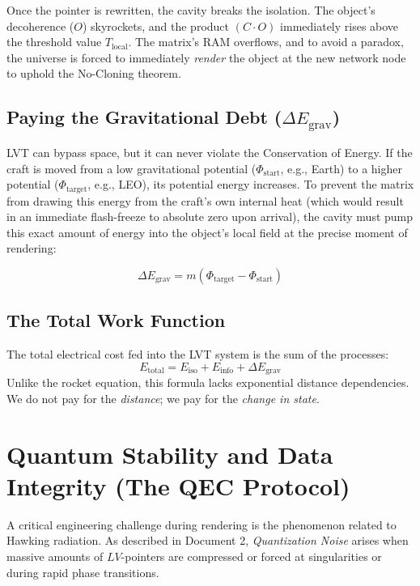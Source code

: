 \documentclass[12pt,a4paper]{article}
\begin{document}
Once the pointer is rewritten, the cavity breaks the isolation. The object's decoherence ($O$) skyrockets, and the product $(C \cdot O)$ immediately rises above the threshold value $T_{\mathrm{local}}$. The matrix's RAM overflows, and to avoid a paradox, the universe is forced to immediately \textit{render} the object at the new network node to uphold the No-Cloning theorem.

\subsection{Paying the Gravitational Debt ($\Delta E_{\text{grav}}$)}
LVT can bypass space, but it can never violate the Conservation of Energy. If the craft is moved from a low gravitational potential ($\Phi_{\text{start}}$, e.g., Earth) to a higher potential ($\Phi_{\text{target}}$, e.g., LEO), its potential energy increases.
To prevent the matrix from drawing this energy from the craft's own internal heat (which would result in an immediate flash-freeze to absolute zero upon arrival), the cavity must pump this exact amount of energy into the object's local field at the precise moment of rendering:

\begin{equation}
\boxed{ \Delta E_{\text{grav}} = m (\Phi_{\text{target}} - \Phi_{\text{start}}) }
\end{equation}

\subsection{The Total Work Function}
The total electrical cost fed into the LVT system is the sum of the processes:
\begin{equation}
\boxed{ E_{\text{total}} = E_{\text{iso}} + E_{\text{info}} + \Delta E_{\text{grav}} }
\end{equation}
Unlike the rocket equation, this formula lacks exponential distance dependencies. We do not pay for the \textit{distance}; we pay for the \textit{change in state}.

\section{Quantum Stability and Data Integrity (The QEC Protocol)}

A critical engineering challenge during rendering is the phenomenon related to Hawking radiation. As described in Document 2, \textit{Quantization Noise} arises when massive amounts of $LV$-pointers are compressed or forced at singularities or during rapid phase transitions.
\end{document}
